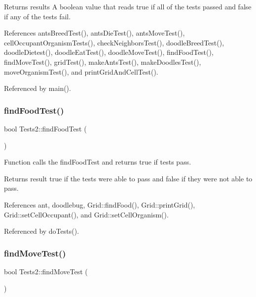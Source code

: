 \begin{DoxyReturn}{Returns}
results A boolean value that reads true if all of the tests passed and false if any of the tests fail. 
\end{DoxyReturn}


References ants\+Breed\+Test(), ants\+Die\+Test(), ants\+Move\+Test(), cell\+Occupant\+Organism\+Tests(), check\+Neighbors\+Test(), doodle\+Breed\+Test(), doodle\+Dietest(), doodle\+Eat\+Test(), doodle\+Move\+Test(), find\+Food\+Test(), find\+Move\+Test(), grid\+Test(), make\+Ants\+Test(), make\+Doodles\+Test(), move\+Organism\+Test(), and print\+Grid\+And\+Cell\+Test().



Referenced by main().

\mbox{\label{classTests2_a29f005f11c9771786d1dd969aea9b051}} 
\subsubsection{find\+Food\+Test()}
{\footnotesize\ttfamily bool Tests2\+::find\+Food\+Test (\begin{DoxyParamCaption}{ }\end{DoxyParamCaption})}

Function calls the find\+Food\+Test and returns true if tests pass.

\begin{DoxyReturn}{Returns}
result true if the tests were able to pass and false if they were not able to pass. 
\end{DoxyReturn}


References ant, doodlebug, Grid\+::find\+Food(), Grid\+::print\+Grid(), Grid\+::set\+Cell\+Occupant(), and Grid\+::set\+Cell\+Organism().



Referenced by do\+Tests().

\mbox{\label{classTests2_af2a95558f0f9cd28a89c82324576ad2e}} 
\subsubsection{find\+Move\+Test()}
{\footnotesize\ttfamily bool Tests2\+::find\+Move\+Test (\begin{DoxyParamCaption}{ }\end{DoxyParamCaption})}

